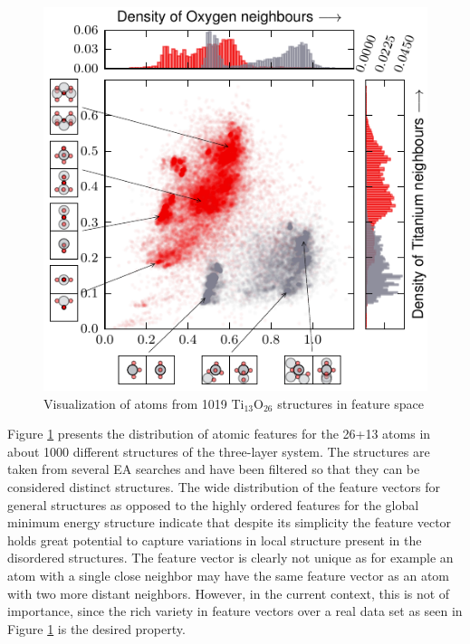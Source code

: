 \documentclass[aip,amsmath,amssymb,reprint]{revtex4-1}
\begin{document}
\begin{figure}[tb]
    \centering
    \includegraphics[width=1.0\columnwidth]{fig3-scatterplot.pdf}
    \caption{Visualization of atoms from 1019 Ti$_{13}$O$_{26}$ structures in feature space}   
    \label{fig_feature}
\end{figure}

Figure \ref{fig_feature} presents the distribution of atomic features
for the 26+13 atoms in about 1000 different structures of the
three-layer system. The structures are taken from several EA searches
and have been filtered so that they can be considered distinct
structures. The wide distribution of the feature vectors for general
structures as opposed to the highly ordered features for the global
minimum energy structure indicate that despite its simplicity the
feature vector holds great potential to capture variations in local
structure present in the disordered structures. The feature vector is
clearly not unique as for example an atom with a single close neighbor may have the
same feature vector as an atom with two more distant neighbors. However, in the
current context, this is not of importance, since the rich variety in feature
vectors over a real data set as seen in Figure \ref{fig_feature} is the
desired property.
\end{document}
